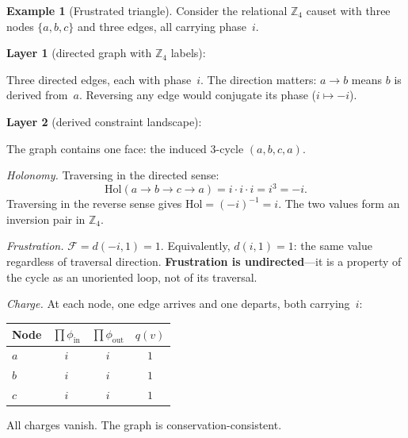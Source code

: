 \documentclass[11pt,a4paper]{article}
\theoremstyle{definition}
\newtheorem{example}[definition]{Example}
\theoremstyle{plain}
\theoremstyle{remark}
\newcommand{\Zf}{\mathbb{Z}_4}
\newcommand{\inp}{\mathrm{in}}
\newcommand{\out}{\mathrm{out}}
\newcommand{\Frust}{\mathcal{F}}
\newcommand{\Hol}{\mathrm{Hol}}
\begin{document}
\begin{example}[Frustrated triangle]\label{ex:triangle}
  Consider the relational $\Zf$ causet with three nodes $\{a, b, c\}$ and three edges, all carrying phase~$i$.

  \medskip
  \noindent\textbf{Layer 1} (directed graph with $\Zf$ labels):

  \begin{center}
  \end{center}

  Three directed edges, each with phase~$i$.  The direction matters: $a \to b$ means $b$ is derived from~$a$.  Reversing any edge would conjugate its phase ($i \mapsto -i$).

  \medskip
  \noindent\textbf{Layer 2} (derived constraint landscape):

  The graph contains one face: the induced 3-cycle $(a, b, c, a)$.

  \emph{Holonomy.}  Traversing in the directed sense:
  \[
    \Hol(a \to b \to c \to a) = i \cdot i \cdot i = i^3 = -i.
  \]
  Traversing in the reverse sense gives $\Hol = (-i)^{-1} = i$.  The two values form an inversion pair in $\Zf$.

  \emph{Frustration.}  $\Frust = d(-i, 1) = 1$.  Equivalently, $d(i, 1) = 1$: the same value regardless of traversal direction.  \textbf{Frustration is undirected}---it is a property of the cycle as an unoriented loop, not of its traversal.

  \emph{Charge.}  At each node, one edge arrives and one departs, both carrying~$i$:
  \begin{center}
    \begin{tabular}{lccc}
      \toprule
      Node & $\prod \phi_{\inp}$ & $\prod \phi_{\out}$ & $q(v)$ \\
      \midrule
      $a$ & $i$ & $i$ & $1$ \\
      $b$ & $i$ & $i$ & $1$ \\
      $c$ & $i$ & $i$ & $1$ \\
      \bottomrule
    \end{tabular}
  \end{center}
  All charges vanish.  The graph is conservation-consistent.


\end{example}
\end{document}
